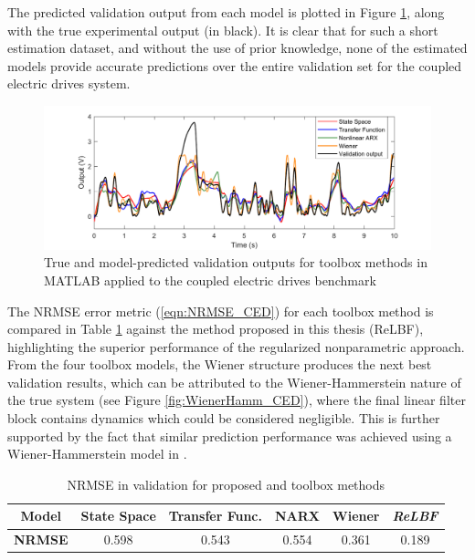 The predicted validation output from each model is plotted in Figure \ref{fig:ValidationToolbox_CED}, along with the true experimental output (in black). It is clear that for such a short estimation dataset, and without the use of prior knowledge, none of the estimated models provide accurate predictions over the entire validation set for the coupled electric drives system. 

\begin{figure}[h]
\centering
\includegraphics[width=\textwidth]{Chapter6_CaseStudies/ToolboxValidations_CED.pdf}
\caption{True and model-predicted validation outputs for toolbox methods in MATLAB applied to the coupled electric drives benchmark} \label{fig:ValidationToolbox_CED}
\end{figure}

The NRMSE error metric (\ref{eqn:NRMSE_CED}) for each toolbox method is compared in Table \ref{tab:NRMSE_CED} against the method proposed in this thesis (ReLBF), highlighting the superior performance of the regularized nonparametric approach. From the four toolbox models, the Wiener structure produces the next best validation results, which can be attributed to the Wiener-Hammerstein nature of the true system (see Figure \ref{fig:WienerHamm_CED}), where the final linear filter block contains dynamics which could be considered negligible. This is further supported by the fact that similar prediction performance was achieved using a Wiener-Hammerstein model in \cite{Wigren2017}.

\begin{table}[h]
\centering
\caption{NRMSE in validation for proposed and toolbox methods}
\begin{tabular}{|c||c|c|c|c|c|}
\hline
\textbf{Model} & State Space & Transfer Func. & NARX & Wiener &\emph{ReLBF} \\
\hline
\textbf{NRMSE} & 0.598 & 0.543 & 0.554 & 0.361 & 0.189 \\
\hline
\end{tabular}
\label{tab:NRMSE_CED}
\end{table}

